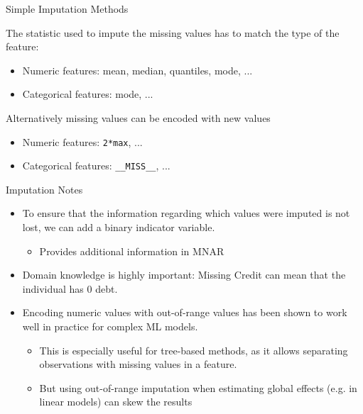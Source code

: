 \documentclass[11pt,compress,t,notes=noshow, xcolor=table]{beamer}
\begin{document}
\begin{frame}{Simple Imputation Methods}

    The statistic used to impute the missing values has to match the type of the feature:
    
    \begin{itemize}
        \item Numeric features: mean, median, quantiles, mode, ...
        \item Categorical features: mode, ...
    \end{itemize}
    
    Alternatively missing values can be encoded with new values
    
    \begin{itemize}
        \item Numeric features: \texttt{2*max}, ...
        \item Categorical features: \texttt{\_\_MISS\_\_}, ...
    \end{itemize}

\end{frame}
\begin{frame}{Imputation Notes}
\begin{itemize}
    \item  To ensure that the information regarding which values were imputed is not lost, we can add a binary indicator variable.
        \begin{itemize}
            \item Provides additional information in MNAR
        \end{itemize}
    \item Domain knowledge is highly important: Missing Credit can mean that the individual has 0 debt.
    \item Encoding numeric values with out-of-range values has been shown to work well in practice for complex ML models.
        \begin{itemize}
            \item This is especially useful for tree-based methods, as it allows separating observations with missing values in a feature.
            \item But using out-of-range imputation when estimating global effects (e.g. in linear models) can skew the results
        \end{itemize}
\end{itemize}    
\end{frame}
\end{document}
